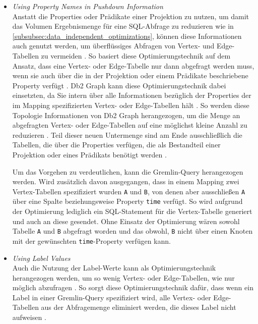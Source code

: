 \begin{itemize}
    \item \textit{Using Property Names in Pushdown Information}\\
    Anstatt die Properties oder Prädikate einer Projektion zu nutzen, um damit das Volumen Ergebnismenge für eine SQL-Abfrage zu reduzieren wie in \autoref{subsubsec:data_independent_optimizations}, können diese Informationen auch genutzt werden, um überflüssiges Abfragen von Vertex- und Edge-Tabellen zu vermeiden \cite{sigmod_tian}. So basiert diese Optimierungstechnik auf dem Ansatz, dass eine Vertex- oder Edge-Tabelle nur dann abgefragt werden muss, wenn sie auch über die in der Projektion oder einem Prädikate beschriebene Property verfügt \cite{sigmod_tian}. Db2 Graph kann diese Optimierungstechnik dabei einsetzten, da Sie intern über alle Informationen bezüglich der Properties der im Mapping spezifizierten Vertex- oder Edge-Tabellen hält \cite{sigmod_tian}. So werden diese Topologie Informationen von Db2 Graph herangezogen, um die Menge an abgefragten Vertex- oder Edge-Tabellen auf eine möglichst kleine Anzahl zu reduzieren \cite{sigmod_tian}. Teil dieser neuen Untermenge sind am Ende ausschließlich die Tabellen, die über die Properties verfügen, die als Bestandteil einer Projektion oder eines Prädikats benötigt werden \cite{sigmod_tian}.

    Um das Vorgehen zu verdeutlichen, kann die Gremlin-Query  herangezogen werden. Wird zusätzlich davon ausgegangen, dass in einem Mapping zwei Vertex-Tabellen spezifiziert wurden \texttt{A} und \texttt{B}, von denen aber ausschließen \texttt{A} über eine Spalte beziehungsweise Property \texttt{time} verfügt. So wird aufgrund der Optimierung lediglich ein SQL-Statement für die Vertex-Tabelle generiert und auch an diese gesendet. Ohne Einsatz der Optimierung wären sowohl Tabelle \texttt{A} und \texttt{B} abgefragt worden und das obwohl, \texttt{B} nicht über einen Knoten mit der gewünschten \texttt{time}-Property verfügen kann.

    \item \textit{Using Label Values}\\
    Auch die Nutzung der Label-Werte kann als Optimierungstechnik herangezogen werden, um so wenig Vertex- oder Edge-Tabellen, wie nur möglich abzufragen \cite{sigmod_tian}. So sorgt diese Optimierungstechnik dafür, dass wenn ein Label in einer Gremlin-Query spezifiziert wird, alle Vertex- oder Edge-Tabellen aus der Abfragemenge eliminiert werden, die dieses Label nicht aufweisen \cite{sigmod_tian}. 
    

\end{itemize}
